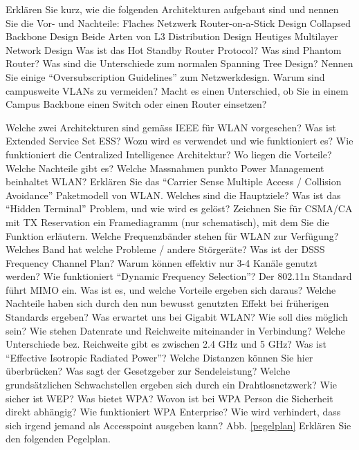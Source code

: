 \documentclass[ngerman,a4paper,12pt]{scrreprt}
\begin{document}
\olR
	\li Erklären Sie kurz, wie die folgenden Architekturen aufgebaut sind und nennen Sie die Vor- und Nachteile:
		\ol 
			\li Flaches Netzwerk
			\li Router-on-a-Stick Design
			\li Collapsed Backbone Design
			\li Beide Arten von L3 Distribution Design
			\li Heutiges Multilayer Network Design
		\olE
	\li Was ist das Hot Standby Router Protocol?
	\li Was sind Phantom Router?
	\li Was sind die Unterschiede zum normalen Spanning Tree Design?
	\li Nennen Sie einige "`Oversubscription Guidelines"' zum Netzwerkdesign.
	\li Warum sind campusweite VLANs zu vermeiden?
	\li Macht es einen Unterschied, ob Sie in einem Campus Backbone einen Switch oder einen Router einsetzen?
\olS


\olR
	\li Welche zwei Architekturen sind gemäss IEEE für WLAN vorgesehen?
	\li Was ist Extended Service Set ESS? Wozu wird es verwendet und wie funktioniert es?
	\li Wie funktioniert die Centralized Intelligence Architektur? Wo liegen die Vorteile? Welche Nachteile gibt es?
	\li Welche Massnahmen punkto Power Management beinhaltet WLAN?
	\li Erklären Sie das "`Carrier Sense Multiple Access / Collision Avoidance"' Paketmodell von WLAN. Welches sind die Hauptziele?
	\li Was ist das "`Hidden Terminal"' Problem, und wie wird es gelöst?
	\li Zeichnen Sie für CSMA/CA mit TX Reservation ein Framediagramm (nur schematisch), mit dem Sie die Funktion erläutern.
	\li Welche Frequenzbänder stehen für WLAN zur Verfügung? Welches Band hat welche Probleme / andere Störgeräte?
	\li Was ist der DSSS Frequency Channel Plan? Warum können effektiv nur 3-4 Kanäle genutzt werden?
	\li Wie funktioniert "`Dynamic Frequency Selection"'?
	\li Der 802.11n Standard führt MIMO ein. Was ist es, und welche Vorteile ergeben sich daraus? Welche Nachteile haben sich durch den nun bewusst genutzten Effekt bei früherigen Standards ergeben?
	\li Was erwartet uns bei Gigabit WLAN? Wie soll dies möglich sein?
	\li Wie stehen Datenrate und Reichweite miteinander in Verbindung? Welche Unterschiede bez. Reichweite gibt es zwischen 2.4 GHz und 5 GHz?
	\li Was ist "`Effective Isotropic Radiated Power"'? Welche Distanzen können Sie hier überbrücken? Was sagt der Gesetzgeber zur Sendeleistung?
	\li Welche grundsätzlichen Schwachstellen ergeben sich durch ein Drahtlosnetzwerk?
	\li Wie sicher ist WEP? Was bietet WPA? Wovon ist bei WPA Person die Sicherheit direkt abhängig? Wie funktioniert WPA Enterprise? Wie wird verhindert, dass sich irgend jemand als Accesspoint ausgeben kann?
	\li Abb. \ref{pegelplan} Erklären Sie den folgenden Pegelplan.
\end{document}
